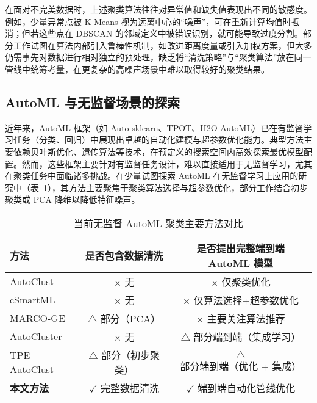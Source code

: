 \documentclass[10pt]{article} %
\numberwithin{equation}{section}
\begin{document}
在面对不完美数据时，上述聚类算法往往对异常值和缺失值表现出不同的敏感度。例如，少量异常点被 K-Means 视为远离中心的“噪声”，可在重新计算均值时抵消\cite{Atif2024}；但若这些点在 DBSCAN 的邻域定义中被错误识别，就可能导致过度分割\cite{Guo2024}。部分工作试图在算法内部引入鲁棒性机制，如改进距离度量或引入加权方案\cite{8896034}，但大多仍需事先对数据进行相对独立的预处理，缺乏将“清洗策略”与“聚类算法”放在同一管线中统筹考量，在更复杂的高噪声场景中难以取得较好的聚类结果。

\subsection{AutoML 与无监督场景的探索}

近年来，AutoML 框架（如 Auto-sklearn\cite{10.5555/3586589.3586850}、TPOT\cite{Olson2019, Romano2021}、H2O AutoML）已在有监督学习任务（分类、回归）中展现出卓越的自动化建模与超参数优化能力。典型方法主要依赖贝叶斯优化、遗传算法\cite{10.1145/3674029.3674058}等技术，在预定义的搜索空间内高效探索最优模型配置。然而，这些框架主要针对有监督任务设计，难以直接适用于无监督学习，尤其在聚类任务中面临诸多挑战\cite{10.1145/3643564}。在少量试图探索 AutoML 在无监督学习上应用的研究中（表~\ref{tab:aml_clustering_summary}），其方法主要聚焦于聚类算法选择与超参数优化，部分工作结合初步聚类或 PCA 降维以降低特征噪声。
\begin{table}[htbp]
\centering
\begin{tabular}{lcc}
\toprule
\textbf{方法} & \textbf{是否包含数据清洗} & \textbf{是否提出完整端到端 AutoML 模型} \\
\midrule
AutoClust\cite{9338346} & $\times$ 无 & $\times$ 仅聚类优化 \\
cSmartML\cite{9671542}  & $\times$ 无 & $\times$ 仅算法选择+超参数优化 \\
MARCO-GE\cite{10031201}  & $\triangle$ 部分（PCA） & $\times$ 主要关注算法推荐 \\
AutoCluster\cite{10.1007/978-3-030-75768-720} & $\times$ 无 & $\triangle$ 部分端到端（集成学习） \\
TPE-AutoClust\cite{10031132} & $\triangle$ 部分（初步聚类） & $\triangle$ 部分端到端（优化 + 集成） \\
\textbf{本文方法} & $\checkmark$ 完整数据清洗 & $\checkmark$ 端到端自动化管线优化 \\
\bottomrule
\end{tabular}
\caption{当前无监督 AutoML 聚类主要方法对比}
\label{tab:aml_clustering_summary}
\end{table}
\end{document}
